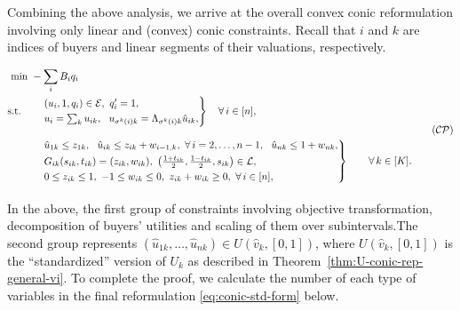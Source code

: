 Combining the above analysis, we arrive at the overall convex conic reformulation involving only linear and (convex) conic constraints.
Recall that $i$ and $k$ are indices of buyers and linear segments of their valuations, respectively.

\begin{align}
	\begin{split}
		\min \ & - \sum_i B_i q_i \\ 
		\st \ \ 
		   & \begin{rcases}
			   & (u_i, 1, q_i) \in \mathcal{E},\ q_i'=1, \\
			   & u_i = \sum_k u_{ik}, \ \ u_{\sigma^k(i) k} = \Lambda_{\sigma^k(i)k} \hat{u}_{ik}, 
		   \end{rcases} \quad  \forall\, i \in [n], \\[2ex]
		   & \begin{rcases}
				& \hat{u}_{1k} \leq z_{1k}, \ \ \hat{u}_{ik} \leq z_{ik} + w_{i-1,k}, \ \forall\, i=2,\dots, n-1,\ \ \hat{u}_{nk} \leq 1 + w_{nk}, \\
				& G_{ik}(s_{ik}, t_{ik}) = (z_{ik}, w_{ik}), \ \left(\frac{1+t_{ik}}{2}, \frac{1-t_{ik}}{2}, s_{ik}\right) \in \mathcal{L}, \\
				& 0\leq z_{ik} \leq 1, \ -1 \leq w_{ik} \leq 0,\ z_{ik}+w_{ik}\geq 0,\ \forall\, i \in [n],
			\end{rcases} \quad\quad \forall\, k \in [K].\\[2ex]
	\end{split}
	\label{eq:overall-conic-reform} \tag{$\mathcal{CP}$}
\end{align}
In the above, the first group of constraints involving objective transformation, decomposition of buyers' utilities and scaling of them over subintervals.The second group represents $(\hat{u}_{1k}, \dots, \hat{u}_{nk}) \in U(\hat{v}_k, [0,1])$, where $U(\hat{v}_k, [0,1])$ is the ``standardized'' version of $U_k$ as described in Theorem~\ref{thm:U-conic-rep-general-vi}.
To complete the proof, we calculate the number of each type of variables in the final reformulation \eqref{eq:conic-std-form} below. 
